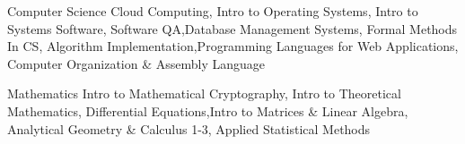 
\vspace{0mm}
\begin{cvskills}

  \vspace{1mm}

  \cvskill
    {Computer Science} %
    {Cloud Computing, Intro to Operating Systems, Intro to Systems Software, Software QA,\newline Database Management Systems, Formal Methods In CS, Algorithm Implementation,\newline Programming Languages for Web Applications, Computer Organization \& Assembly Language} %

   \cvskill
    {Mathematics} %
	{Intro to Mathematical Cryptography, Intro to Theoretical Mathematics, Differential Equations,\newline Intro to Matrices \& Linear Algebra, Analytical Geometry \& Calculus 1-3, Applied Statistical Methods} %


\end{cvskills}